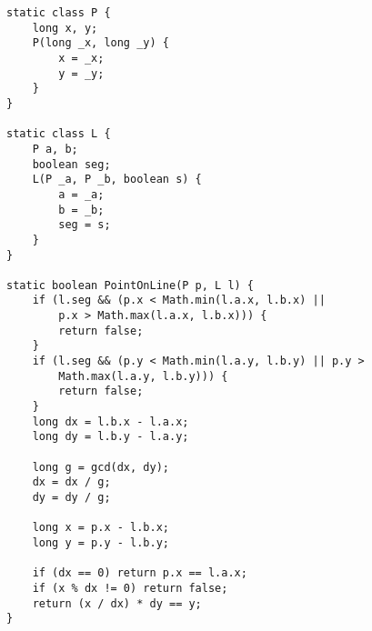 \begin{verbatim}
static class P {
	long x, y;	
	P(long _x, long _y) {
		x = _x;
		y = _y;
	}
}
	
static class L {
	P a, b;
	boolean seg;
	L(P _a, P _b, boolean s) {
		a = _a;
		b = _b;
		seg = s;
	}
}
	
static boolean PointOnLine(P p, L l) {
	if (l.seg && (p.x < Math.min(l.a.x, l.b.x) || 
		p.x > Math.max(l.a.x, l.b.x))) {
		return false;
	}
	if (l.seg && (p.y < Math.min(l.a.y, l.b.y) || p.y >
		Math.max(l.a.y, l.b.y))) {
		return false;
	}
	long dx = l.b.x - l.a.x;
	long dy = l.b.y - l.a.y;

	long g = gcd(dx, dy);
	dx = dx / g;
	dy = dy / g;

	long x = p.x - l.b.x;
	long y = p.y - l.b.y;

	if (dx == 0) return p.x == l.a.x;
	if (x % dx != 0) return false;
	return (x / dx) * dy == y;
}
\end{verbatim}